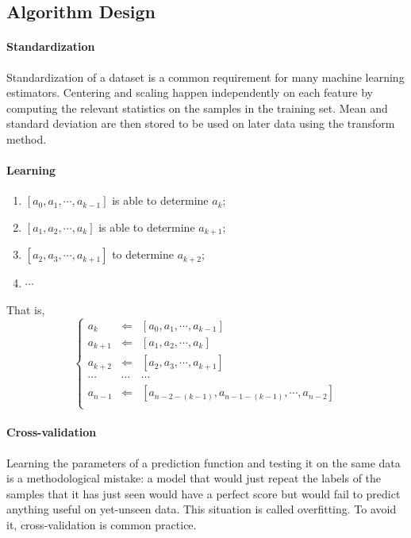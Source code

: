 \documentclass[a0b,portrait]{a0poster}
\begin{document}
\begin{multicols}{3}
\subsection*{Algorithm Design}
\paragraph*{Standardization}
Standardization of a dataset is a common requirement for many machine learning estimators. Centering and scaling happen independently on each feature by computing the relevant statistics on the samples in the training set. Mean and standard deviation are then stored to be used on later data using the transform method.

\paragraph*{Learning}
\begin{enumerate}
\item $\left[a_0, a_1, \cdots, a_{k - 1}\right]$ is able to determine $a_{k}$;
\item $\left[a_1, a_2, \cdots, a_{k}\right]$ is able to determine $a_{k + 1}$;
\item $\left[a_2, a_3, \cdots, a_{k + 1}\right]$ to determine $a_{k + 2}$;
\item $\cdots$
\end{enumerate}
That is,
\begin{equation}
\left\{
\begin{array}{rcl}
a_{k} & \Leftarrow & \left[a_0, a_1, \cdots, a_{k - 1}\right]\\
a_{k + 1} & \Leftarrow & \left[a_1, a_2, \cdots, a_{k}\right]\\
a_{k + 2} & \Leftarrow & \left[a_2, a_3, \cdots, a_{k + 1}\right]\\
\cdots & \cdots & \cdots\\
a_{n - 1} & \Leftarrow & \left[a_{n - 2 - \left(k - 1\right)}, a_{n - 1 - \left(k - 1\right)}, \cdots, a_{n - 2}\right]\\
\end{array}
\right.
\end{equation}
\paragraph*{Cross-validation}
Learning the parameters of a prediction function and testing it on the same data is a methodological mistake: a model that would just repeat the labels of the samples that it has just seen would have a perfect score but would fail to predict anything useful on yet-unseen data. This situation is called overfitting. To avoid it, cross-validation is common practice.

\end{multicols}
\end{document}
